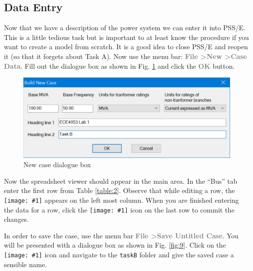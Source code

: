\documentclass[paper=a4, fontsize=11pt]{article}
\newcommand{\mychar}[1]{%
  \begingroup\normalfont
  \texttt{[image: \#1]}%
  \endgroup
}
\begin{document}
\begin{landscape}
\end{landscape}


\subsection{Data Entry}
Now that we have a description of the power system we can enter it into PSS/E. This is a little tedious task but is important to at least know the procedure if you want to create a model from scratch. It is a good idea to close PSS/E and reopen it (so that it forgets about Task A). Now use the menu bar: \textbf{\textcolor{gray}{File \textgreater \phantom{ }New \textgreater \phantom{ }Case Data}}.  Fill out the dialogue box as shown in Fig. \ref{fig:8} and click the \textbf{\textcolor{gray}{OK}} button.

\begin{figure}[h]
\centering
\includegraphics[scale=0.32]{fig8_newcase.pdf}
\caption{New case dialogue box}
\label{fig:8}
\end{figure}

Now the spreadsheet viewer should appear in the main area. In the ``Bus'' tab enter the first row from Table \ref{table:2}. Observe that while editing a row, the \mychar{pencil.png} appears on the left most column. When you are finished entering the data for a row, click the \mychar{star.png} icon on the last row to commit the changes.

In order to save the case, use the menu bar \textbf{\textcolor{gray}{File \textgreater \phantom{ }Save Untitled Case}}. You will be presented with a dialogue box as shown in Fig. \ref{fig:9}. Click on the \mychar{browse.png} icon and navigate to the \texttt{taskB} folder and give the saved case a sensible name.
\end{document}
